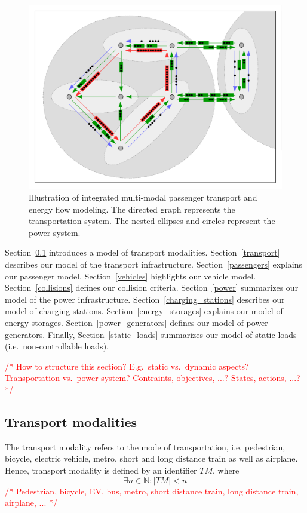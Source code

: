 \documentclass[conference]{IEEEtran}
\newcommand{\todo}[1]{\textcolor{red}{/* #1 */}}
\begin{document}
	\begin{figure}
		\centering
		\includegraphics[width=\columnwidth]{gfx/model.pdf}
		\caption{Illustration of integrated multi-modal passenger transport and energy flow modeling. The directed graph represents the transportation system. The nested ellipses and circles represent the power system.}
		\label{illustration}
	\end{figure}
	
	Section~\ref{modalities} introduces a model of transport modalities. Section~\ref{transport} describes our model of the transport infrastructure. Section~\ref{passengers} explains our passenger model. Section~\ref{vehicles} highlights our vehicle model. Section~\ref{collisions} defines our collision criteria. Section~\ref{power} summarizes our model of the power infrastructure. Section~\ref{charging_stations} describes our model of charging stations. Section~\ref{energy_storages} explains our model of energy storages. Section~\ref{power_generators} defines our model of power generators. Finally, Section~\ref{static_loads} summarizes our model of static loads (i.e.\ non-controllable loads).
	
	\todo{How to structure this section? E.g.\ static vs.\ dynamic aspects? Transportation vs.\ power system? Contraints, objectives, ...? States, actions, ...?}
	
	\subsection{Transport modalities}
	\label{modalities}
	
	The transport modality refers to the mode of transportation, i.e. pedestrian, bicycle, electric vehicle, metro, short and long distance train as well as airplane. Hence, transport modality is defined by an identifier $TM$, where
	\[
		 \exists n \in \mathbb{N} : |TM| < n
	\]
	\todo{Pedestrian, bicycle, EV, bus, metro, short distance train, long distance train, airplane, ...}
	
\end{document}
